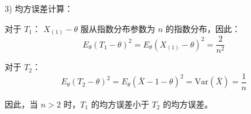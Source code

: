 \documentclass[UTF8]{report}
\theoremstyle{MyLineTheoremStyle} %
\theoremstyle{MyBlockTheoremStyle} %
\theoremstyle{MySubsubsectionStyle} %
\begin{document}
3) 均方误差计算：

对于 $T_1$：
$X_{(1)}-\theta$ 服从指数分布参数为 $n$ 的指数分布，因此：
$$
E_\theta(T_1-\theta)^2=E_\theta(X_{(1)}-\theta)^2=\frac{2}{n^2}
$$

对于 $T_2$：
$$
E_\theta(T_2-\theta)^2=E_\theta(\bar{X}-1-\theta)^2=\text{Var}(\bar{X})=\frac{1}{n}
$$

因此，当 $n>2$ 时，$T_1$ 的均方误差小于 $T_2$ 的均方误差。

%






\end{document}
